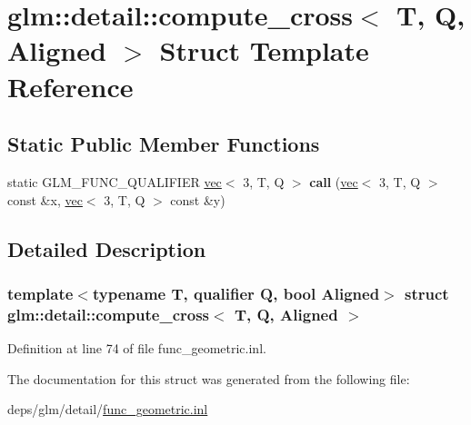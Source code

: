\hypertarget{structglm_1_1detail_1_1compute__cross}{}\section{glm\+:\+:detail\+:\+:compute\+\_\+cross$<$ T, Q, Aligned $>$ Struct Template Reference}
\label{structglm_1_1detail_1_1compute__cross}
\subsection*{Static Public Member Functions}
\begin{DoxyCompactItemize}
\item 
\mbox{\label{structglm_1_1detail_1_1compute__cross_af67135252e5e44f52bd67878a11dee13}} 
static G\+L\+M\+\_\+\+F\+U\+N\+C\+\_\+\+Q\+U\+A\+L\+I\+F\+I\+ER \hyperlink{structglm_1_1vec}{vec}$<$ 3, T, Q $>$ {\bfseries call} (\hyperlink{structglm_1_1vec}{vec}$<$ 3, T, Q $>$ const \&x, \hyperlink{structglm_1_1vec}{vec}$<$ 3, T, Q $>$ const \&y)
\end{DoxyCompactItemize}


\subsection{Detailed Description}
\subsubsection*{template$<$typename T, qualifier Q, bool Aligned$>$\newline
struct glm\+::detail\+::compute\+\_\+cross$<$ T, Q, Aligned $>$}



Definition at line 74 of file func\+\_\+geometric.\+inl.



The documentation for this struct was generated from the following file\+:\begin{DoxyCompactItemize}
\item 
deps/glm/detail/\hyperlink{func__geometric_8inl}{func\+\_\+geometric.\+inl}\end{DoxyCompactItemize}
